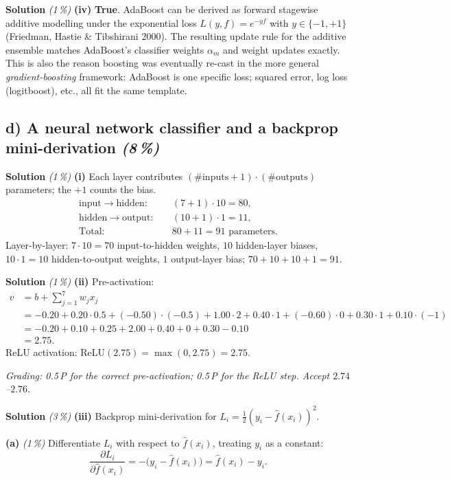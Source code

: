 \documentclass[11pt,a4paper]{article}
\newcommand{\subpoints}[1]{\textit{(#1\,\%)}}
\newcommand{\sol}{\noindent\textbf{Solution}}
\begin{document}
\medskip
\sol{} \subpoints{1} \textbf{(iv)} \textbf{True}. AdaBoost can be derived as forward stagewise
additive modelling under the exponential loss $L(y, f) = e^{-yf}$ with $y \in \{-1, +1\}$
(Friedman, Hastie \& Tibshirani 2000). The resulting update rule for the additive ensemble
matches AdaBoost's classifier weights $\alpha_m$ and weight updates exactly. This is also the
reason boosting was eventually re-cast in the more general \emph{gradient-boosting} framework:
AdaBoost is one specific loss; squared error, log loss (logitboost), etc., all fit the same
template.

\subsection*{d) A neural network classifier and a backprop mini-derivation \subpoints{8}}

\sol{} \subpoints{1} \textbf{(i)} Each layer contributes
$(\text{\#inputs} + 1)\cdot(\text{\#outputs})$ parameters; the $+1$ counts the bias.
\begin{align*}
\text{input}\to\text{hidden}:&\quad (7 + 1)\cdot 10 = 80, \\
\text{hidden}\to\text{output}:&\quad (10 + 1)\cdot 1 = 11, \\
\text{Total:}&\quad 80 + 11 = \boxed{91}\text{ parameters.}
\end{align*}
Layer-by-layer: $7\cdot 10 = 70$ input-to-hidden weights, $10$ hidden-layer biases, $10\cdot 1 = 10$
hidden-to-output weights, $1$ output-layer bias; $70+10+10+1=91$. \checkmark

\medskip
\sol{} \subpoints{1} \textbf{(ii)} Pre-activation:
\begin{align*}
v &= b + \sum_{j=1}^7 w_j x_j \\
  &= -0.20 + 0.20\cdot 0.5 + (-0.50)\cdot(-0.5) + 1.00\cdot 2 + 0.40\cdot 1
       + (-0.60)\cdot 0 + 0.30\cdot 1 + 0.10\cdot(-1) \\
  &= -0.20 + 0.10 + 0.25 + 2.00 + 0.40 + 0 + 0.30 - 0.10 \\
  &= 2.75.
\end{align*}
ReLU activation: $\mathrm{ReLU}(2.75) = \max(0, 2.75) = \boxed{2.75}$.

\noindent\emph{Grading: 0.5\,P for the correct pre-activation; 0.5\,P for the ReLU step. Accept
$2.74$--$2.76$.}

\medskip
\sol{} \subpoints{3} \textbf{(iii)} Backprop mini-derivation for $L_i = \tfrac{1}{2}(y_i - \hat f(x_i))^2$.

\textbf{(a)} \subpoints{1} Differentiate $L_i$ with respect to $\hat f(x_i)$, treating $y_i$ as a
constant:
$$\boxed{\frac{\partial L_i}{\partial \hat f(x_i)} = -\bigl(y_i - \hat f(x_i)\bigr) = \hat f(x_i) - y_i.}$$
\end{document}
